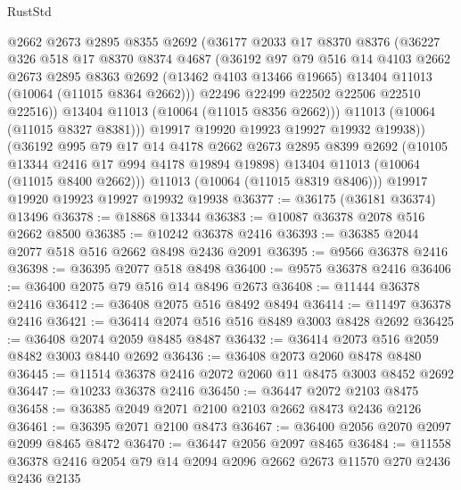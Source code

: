 \begin{lexlean}{RustStd}
\begin{coremodule}
              @2662
              @2673
              @2895
              @8355
              @2692
              (@36177
                @2033
                @17
                @8370
                @8376
                (@36227
                  @326
                  @518
                  @17
                  @8370
                  @8374
                  @4687
                  (@36192
                    @97
                    @79
                    @516
                    @14
                    @4103
                    @2662
                    @2673
                    @2895
                    @8363
                    @2692
                    (@13462 @4103 @13466 @19665)
                    @13404
                    @11013
                    (@10064 (@11015 @8364 @2662)))
                  @22496
                  @22499
                  @22502
                  @22506
                  @22510
                  @22516))
              @13404
              @11013
              (@10064 (@11015 @8356 @2662)))
            @11013
            (@10064 (@11015 @8327 @8381)))
          @19917
          @19920
          @19923
          @19927
          @19932
          @19938))
      (@36192
        @995
        @79
        @17
        @14
        @4178
        @2662
        @2673
        @2895
        @8399
        @2692
        (@10105 @13344 @2416 @17 @994 @4178 @19894 @19898)
        @13404
        @11013
        (@10064 (@11015 @8400 @2662)))
      @11013
      (@10064 (@11015 @8319 @8406)))
    @19917
    @19920
    @19923
    @19927
    @19932
    @19938
@36377 := @36175 (@36181 @36374) @13496
@36378 := @18868 @13344
@36383 := @10087 @36378 @2078 @516 @2662 @8500
@36385 := @10242 @36378 @2416
@36393 := @36385 @2044 @2077 @518 @516 @2662 @8498 @2436 @2091
@36395 := @9566 @36378 @2416
@36398 := @36395 @2077 @518 @8498
@36400 := @9575 @36378 @2416
@36406 := @36400 @2075 @79 @516 @14 @8496 @2673
@36408 := @11444 @36378 @2416
@36412 := @36408 @2075 @516 @8492 @8494
@36414 := @11497 @36378 @2416
@36421 := @36414 @2074 @516 @516 @8489 @3003 @8428 @2692
@36425 := @36408 @2074 @2059 @8485 @8487
@36432 := @36414 @2073 @516 @2059 @8482 @3003 @8440 @2692
@36436 := @36408 @2073 @2060 @8478 @8480
@36445 := @11514 @36378 @2416 @2072 @2060 @11 @8475 @3003 @8452 @2692
@36447 := @10233 @36378 @2416
@36450 := @36447 @2072 @2103 @8475
@36458 := @36385 @2049 @2071 @2100 @2103 @2662 @8473 @2436 @2126
@36461 := @36395 @2071 @2100 @8473
@36467 := @36400 @2056 @2070 @2097 @2099 @8465 @8472
@36470 := @36447 @2056 @2097 @8465
@36484 := @11558 @36378 @2416 @2054 @79 @14 @2094 @2096 @2662 @2673 @11570 @270 @2436 @2436 @2135

\end{coremodule}
\end{lexlean}
